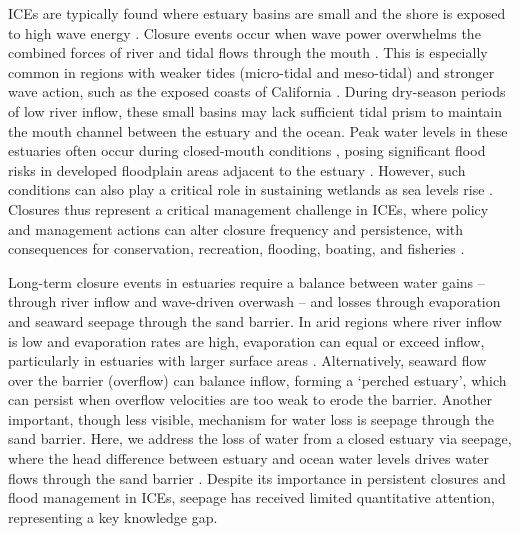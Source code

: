 \documentclass[preprint,12pt,authoryear]{elsarticle}
\begin{document}
ICEs are typically found where estuary basins are small and the shore is exposed to high wave energy \citep{cooper2001geomorphological}. Closure events occur when wave power overwhelms the combined forces of river and tidal flows through the mouth \citep{behrens2013episodic, behrens2015quantified}.  This  is especially common in regions with weaker tides (micro-tidal and meso-tidal) and stronger wave action, such as the exposed coasts of California 
\citep{mcsweeney2017intermittently}. 
During dry-season periods of low river inflow, these small basins may lack sufficient tidal prism to maintain the mouth channel between the estuary and the ocean. 
Peak water levels in these estuaries often occur during closed-mouth conditions \citep{booysen2020methods}, posing significant flood risks in developed floodplain areas adjacent to the estuary \citep{clark2019systematic}. However, such conditions can also play a critical role in sustaining wetlands as sea levels rise \citep{thorne2021wetlands}. Closures thus represent a critical management challenge in ICEs, where policy and management actions can alter closure frequency and persistence, with consequences for conservation, recreation, flooding, boating, and fisheries \citep{stein2021advancing}.

Long-term closure events in estuaries require a balance between water gains --through river inflow and wave-driven overwash -- and losses through evaporation and seaward seepage through the sand barrier. 
In arid regions where river inflow is low and evaporation rates are high, evaporation can equal or exceed inflow, particularly in estuaries with larger surface areas \citep{largier2023recognizing}. 
Alternatively, seaward flow over the barrier (overflow) can balance inflow, forming a `perched estuary', which can persist when overflow velocities are too weak to erode the barrier. 
Another important, though less visible, mechanism for water loss is seepage through the sand barrier.
Here, we address the loss of water from a closed estuary via seepage, where  the head difference between estuary and ocean water levels drives water flows through the sand barrier \citep{perissinotto2010ecosystem}. 
 Despite its importance in persistent closures and flood management in ICEs, seepage has received limited quantitative attention, representing a key knowledge gap. 
\end{document}
